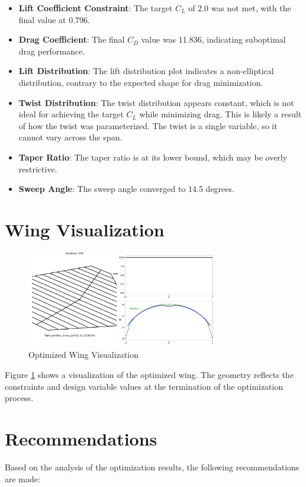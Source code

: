 \documentclass{article}
\begin{document}
\begin{itemize}
    \item \textbf{Lift Coefficient Constraint}: The target $C_L$ of 2.0 was not met, with the final value at 0.796.
    \item \textbf{Drag Coefficient}: The final $C_D$ value was 11.836, indicating suboptimal drag performance.
    \item \textbf{Lift Distribution}: The lift distribution plot indicates a non-elliptical distribution, contrary to the expected shape for drag minimization.
    \item \textbf{Twist Distribution}: The twist distribution appears constant, which is not ideal for achieving the target $C_L$ while minimizing drag.  This is likely a result of how the twist was parameterized.  The twist is a single variable, so it cannot vary across the span.
    \item \textbf{Taper Ratio}: The taper ratio is at its lower bound, which may be overly restrictive.
    \item \textbf{Sweep Angle}: The sweep angle converged to 14.5 degrees.
\end{itemize}


\section{Wing Visualization}

\begin{figure}[h!]
    \centering
    \includegraphics[width=0.75\textwidth]{./Optimized_Wing.pdf}
    \caption{Optimized Wing Visualization}
    \label{fig:optimized_wing}
\end{figure}

Figure \ref{fig:optimized_wing} shows a visualization of the optimized wing. The geometry reflects the constraints and design variable values at the termination of the optimization process.


\section{Recommendations}
Based on the analysis of the optimization results, the following recommendations are made:
\end{document}
